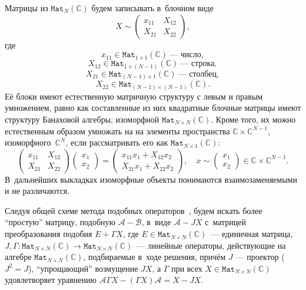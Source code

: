\documentclass[14pt,a4paper]{extarticle}
\theoremstyle{definition}
\begin{document}
Матрицы из \( \mathtt{Mat}_N(\mathbb{C}) \) будем записывать в~блочном виде
\[ X \sim
    \begin{pmatrix}
    x_{11} & X_{12} \\
    X_{21} & X_{22}
    \end{pmatrix}, \]
    где \[ x_{11} \in \mathtt{Mat}_{1{\times}1}(\mathbb{C})\ \text{--- число}, \]
    \[ X_{12} \in \mathtt{Mat}_{1{\times}(N-1)}(\mathbb{C})\ \text{--- строка}, \]
    \[ X_{21} \in \mathtt{Mat}_{(N-1){\times}1}(\mathbb{C})\ \text{--- столбец}, \]
    \[ X_{22} \in \mathtt{Mat}_{(N-1){\times}(N-1)}(\mathbb{C}). \]
Её блоки имеют естественную матричную структуру с левым и правым умножением,
равно как составленные из них квадратные блочные матрицы имеют структуру
Банаховой алгебры, изоморфной \( \mathtt{Mat}_{N{\times}N}(\mathbb{C})\).
Кроме того, их можно естественным образом умножать на
на элементы пространства \( \mathbb{C}\times\mathbb{C}^{N-1} \),
изоморфного~\( \mathbb{C}^N \), если рассматривать его как
\( \mathtt{Mat}_{N{\times}1}(\mathbb{C})\):
\[
    \begin{pmatrix}
    x_{11} & X_{12} \\
    X_{21} & X_{22}
    \end{pmatrix}
    \begin{pmatrix} x_1 \\ x_2 \end{pmatrix}
  = \begin{pmatrix}
      x_{11} x_1 + X_{12} x_2 \\
      X_{21} x_1 + X_{22} x_2
      \end{pmatrix},\quad x \sim \begin{pmatrix} x_1 \\ x_2 \end{pmatrix}\in \mathbb{C}\times\mathbb{C}^{N-1}.
    \]
В~дальнейших выкладках изоморфные объекты понимаются взаимозаменяемыми и не различаются.

Следуя общей схеме метода подобных операторов~\cite{baskakov1986theorem,baskakov1987theorem,baskakov1994spectral,baskakov2002splitting},
будем искать более ``простую'' матрицу, подобную \( \mathcal{A} - \mathcal{B} \),
в~виде \( \mathcal{A} - J X \)
с~матрицей преобразования подобия \( E + \Gamma X \),
где \( E\in{\mathtt{Mat}_{N{\times}N}(\mathbb{C})} \)~--- единичная матрица,
\( J,\Gamma : \mathtt{Mat}_{N{\times}N}(\mathbb{C})\to\mathtt{Mat}_{N{\times}N}(\mathbb{C}) \)~--- линейные операторы,
действующие на алгебре \( \mathtt{Mat}_{N{\times}N}(\mathbb{C}) \), подбираемые
в~ходе решения,
      прич\"ем \( J \) --- проектор (\(J^2=J\)),
      ``упрощающий'' возмущение \( JX \),
      а \( \Gamma \)
      при всех \( X\in {\mathtt{Mat}_{N{\times}N}(\mathbb{C})} \) %
      удовлетворяет уравнению
          \( \mathcal{A}\Gamma X - (\Gamma X) \mathcal{A} = X - JX. \)
\end{document}
